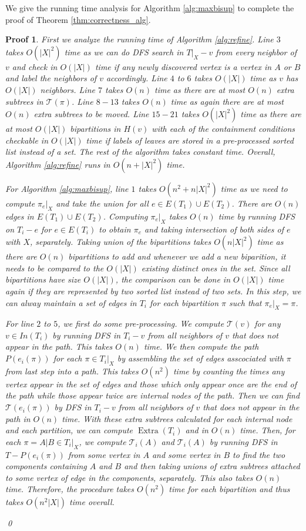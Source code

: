 \documentclass[twocolumn]{bmcart}%
\DeclareMathOperator*{\extra}{Extra}
\theoremstyle{mystyle}
\theoremstyle{proofstyle}
\newtheorem*{proof2}{Proof}
\newenvironment{proofnospace}{\begin{proof2}}{\qed \end{proof2}}
\begin{document}
We give the running time analysis for Algorithm \ref{alg:maxbisup} to complete the proof of Theorem \ref{thm:correctness_alg}. \smallskip
\begin{proofnospace}
First we analyze the running time of Algorithm \ref{alg:refine}. Line $3$ takes $O(|X|^2)$ time as we can do DFS search in $T|_X - v$ from every neighbor of $v$ and check in $O(|X|)$ time if any newly discovered vertex is a vertex in $A$ or $B$ and label the neighbors of $v$ accordingly. Line $4$ to $6$ takes $O(|X|)$ time as $v$ has $O(|X|)$ neighbors. Line $7$ takes $O(n)$ time as there are at most $O(n)$ extra subtrees in $\mathcal{T}(\pi)$. Line $8-13$ takes $O(n)$ time as again there are at most $O(n)$ extra subtrees to be moved. Line $15 -21$ takes $O(|X|^2)$ time as there are at most $O(|X|)$ bipartitions in $H(v)$ with each of the containment conditions checkable in $O(|X|)$ time if labels of leaves are stored in a pre-processed sorted list instead of a set. The rest of the algorithm takes constant time. Overall, Algorithm \ref{alg:refine} runs in $O(n + |X|^2)$ time.

For Algorithm \ref{alg:maxbisup}, line $1$ takes $O(n^2+ n|X|^2)$ time as we need to compute $\pi_e|_X$ and take the union for all $e \in E(T_1) \cup E(T_2)$. There are $O(n)$ edges in $E(T_1) \cup E(T_2)$. Computing $\pi_e|_X$ takes $O(n)$ time by running DFS on $T_i - e$ for $e \in E(T_i)$ to obtain $\pi_e$ and taking intersection of both sides of $e$ with $X$, separately. Taking union of the bipartitions takes $O(n |X|^2)$ time as there are $O(n)$ bipartitions to add and whenever we add a new biparition, it needs to be compared to the $O(|X|)$ existing distinct ones in the set. Since all bipartitions have size $O(|X|)$, the comparison can be done in $O(|X|)$ time again if they are represented by two sorted list instead of two sets. In this step, we can alway maintain a set of edges in $T_i$ for each bipartition $\pi$ such that $\pi_e|_X = \pi$. 

For line $2$ to $5$, we first do some pre-processing. We compute $\mathcal{T}(v)$ for any $v \in In(T_i)$ by running DFS in $T_i - v$ from all neighbors of $v$ that does not appear in the path. This takes $O(n)$ time. We then compute the path $P(e_i(\pi))$ for each $\pi \in T_i|_X$ by assembling the set of edges asscociated with $\pi$ from last step into a path. This takes $O(n^2)$ time by counting the times any vertex appear in the set of edges and those which only appear once are the end of the path while those appear twice are internal nodes of the path. Then we can find $\mathcal{T}(e_i(\pi))$ by DFS in $T_i - v$ from all neighbors of $v$ that does not appear in the path in $O(n)$ time. With these extra subtrees calculated for each internal node and each partition, we can compute $\extra(T_i)$ and in $O(n)$ time. Then, for each $\pi = A|B \in T_i|_X$, we compute $\mathcal{T}_i(A)$ and $\mathcal{T}_i(A)$ by running DFS in $T - P(e_i(\pi))$ from some vertex in $A$ and some vertex in $B$ to find the two components containing $A$ and $B$ and then taking unions of extra subtrees attached to some vertex of edge in the components, separately. This also takes $O(n)$ time. Therefore, the procedure takes $O(n^2)$ time for each bipartition and thus takes $O(n^2|X|)$ time overall. 


\end{proofnospace}
\end{document}
